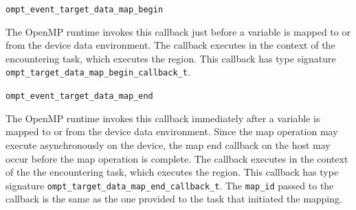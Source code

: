 \documentclass{article}
\begin{document}
\begin{description}
\item \verb|ompt_event_target_data_map_begin|

  The OpenMP runtime invokes this callback just before a variable is mapped to or from the device data environment.
  The callback executes in the context of the encountering task, which executes the region.
  This callback has type signature \verb|ompt_target_data_map_begin_callback_t|.  

\item \verb|ompt_event_target_data_map_end|

  The OpenMP runtime invokes this callback immediately after a variable is mapped to or from the device data environment. Since the map operation may execute asynchronously on the device, the map end callback on the host may occur before the map operation is complete.
  The callback executes in the context of the the encountering task, which executes the region.
  This callback has type signature \verb|ompt_target_data_map_end_callback_t|. The \verb|map_id| passed to the callback is the same as the one provided to the task that initiated the mapping.
  

% 
% 
% 



\end{description}
\end{document}
